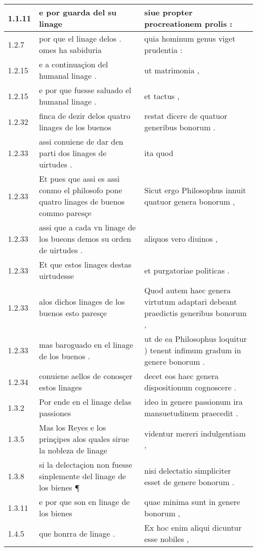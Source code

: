 \begin{tabular}{|p{1cm}|p{6.5cm}|p{6.5cm}|}

\hline
1.1.11 & e por guarda del su linage & siue propter procreationem prolis : \\\hline
1.2.7 & por que el linage delos . omes ha sabiduria & quia hominum genus viget prudentia : \\\hline
1.2.15 & e a continuaçion del humanal linage . & ut matrimonia , \\\hline
1.2.15 & e por que fuesse saluado el humanal linage . & et tactus , \\\hline
1.2.32 & finca de dezir delos quatro linages de los buenos & restat dicere de quatuor generibus bonorum . \\\hline
1.2.33 & assi conuiene de dar den parti dos linages de uirtudes . & ita quod \\\hline
1.2.33 & Et pues que assi es assi conmo el philosofo pone quatro linages de buenos commo paresçe & Sicut ergo Philosophus innuit quatuor genera bonorum , \\\hline
1.2.33 & assi que a cada vn linage de los bueons demos su orden de uirtudes . & aliquos vero diuinos , \\\hline
1.2.33 & Et que estos linages destas uirtudesse & et purgatoriae politicas . \\\hline
1.2.33 & alos dichos linages de los buenos esto paresçe & Quod autem haec genera virtutum adaptari debeant praedictis generibus bonorum , \\\hline
1.2.33 & mas baroguado en el linage de los buenos . & ut de ea Philosophus loquitur ) tenent infimum gradum in genere bonorum . \\\hline
1.2.34 & conuiene aellos de conosçer estos linages & decet eos haec genera dispositionum cognoscere . \\\hline
1.3.2 & Por ende en el linage delas passiones & ideo in genere passionum ira mansuetudinem praecedit . \\\hline
1.3.5 & Mas los Reyes e los prinçipes alos quales sirue la nobleza de linage & videntur mereri indulgentiam , \\\hline
1.3.8 & si la delectaçion non fuesse sinplemente del linage de los bienes ¶ & nisi delectatio simpliciter esset de genere bonorum . \\\hline
1.3.11 & e por que son en linage de los bienes & quae minima sunt in genere bonorum , \\\hline
1.4.5 & que honrra de linage . & Ex hoc enim aliqui dicuntur esse nobiles , \\\hline

\end{tabular}
